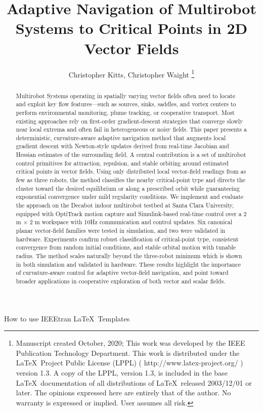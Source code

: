 \documentclass[lettersize,journal]{IEEEtran}
\begin{document}
\title{Adaptive Navigation of Multirobot Systems to Critical Points in 2D Vector Fields}
\author{Christopher Kitts, Christopher Waight
\thanks{Manuscript created October, 2020; This work was developed by the IEEE Publication Technology Department. This work is distributed under the \LaTeX \ Project Public License (LPPL) ( http://www.latex-project.org/ ) version 1.3. A copy of the LPPL, version 1.3, is included in the base \LaTeX \ documentation of all distributions of \LaTeX \ released 2003/12/01 or later. The opinions expressed here are entirely that of the author. No warranty is expressed or implied. User assumes all risk.}}

%
{How to use IEEEtran \LaTeX \ Templates}

\maketitle

\begin{abstract}
Multirobot Systems operating in spatially varying vector fields often need to locate and exploit key flow features—such as sources, sinks, saddles, and vortex centers to perform environmental monitoring, plume tracking, or cooperative transport. Most existing approaches rely on first-order gradient-descent strategies that converge slowly near local extrema and often fail in heterogeneous or noisy fields. This paper presents a deterministic, curvature-aware adaptive navigation method that augments local gradient descent with Newton-style updates derived from real-time Jacobian and Hessian estimates of the surrounding field. A central contribution is a set of multirobot control primitives for attraction, repulsion, and stable orbiting around estimated critical points in vector fields. Using only distributed local vector-field readings from as few as three robots, the method classifies the nearby critical-point type and directs the cluster toward the desired equilibrium or along a prescribed orbit while guaranteeing exponential convergence under mild regularity conditions. We implement and evaluate the approach on the Decabot indoor multirobot testbed at Santa Clara University, equipped with OptiTrack motion capture and Simulink-based real-time control over a 2 m × 2 m workspace with 10Hz communication and control updates. Six canonical planar vector-field families were tested in simulation, and two were validated in hardware. Experiments confirm robust classification of critical-point type, consistent convergence from random initial conditions, and stable orbital motion with tunable radius. The method scales naturally beyond the three-robot minimum which is shown in both simulation and validated in hardware. These results highlight the importance of curvature-aware control for adaptive vector-field navigation, and point toward broader applications in cooperative exploration of both vector and scalar fields.
\end{abstract}
\end{document}
